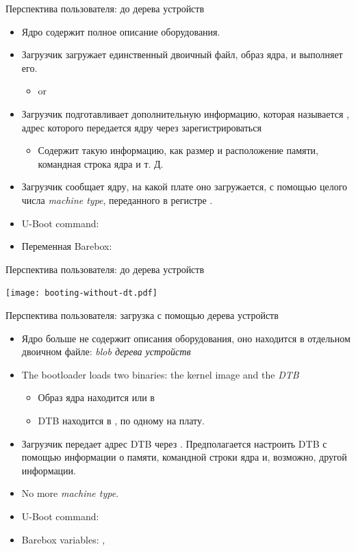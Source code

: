 \documentclass[obeyspaces,spaces,hyphens]{beamer}
\begin{document}
\begin{frame}{Перспектива пользователя: до дерева устройств}
  \begin{itemize}
  \item Ядро содержит полное описание оборудования.
  \item Загрузчик загружает единственный двоичный файл, образ ядра, и выполняет его.
    \begin{itemize}
    \item {} or 
    \end{itemize}
  \item Загрузчик подготавливает дополнительную информацию, которая называется
     , адрес которого передается ядру через
     зарегистрироваться 
    \begin{itemize}
    \item Содержит такую информацию, как размер и расположение памяти, командная строка ядра и т. Д.
    \end{itemize}
  \item Загрузчик сообщает ядру, на какой плате оно загружается, с помощью целого числа {\em machine type}, переданного в регистре
    .
  \item U-Boot command: 
  \item Переменная Barebox: 
  \end{itemize}
\end{frame}

\begin{frame}{Перспектива пользователя: до дерева устройств}
  \begin{center}
    \texttt{[image: booting-without-dt.pdf]}
  \end{center}
\end{frame}

\begin{frame}{Перспектива пользователя: загрузка с помощью дерева устройств}
  \begin{itemize}
  \item Ядро больше не содержит описания оборудования, оно находится в отдельном двоичном файле: {\em blob дерева устройств}
  \item The bootloader loads two binaries: the kernel image and the
    {\em DTB}
    \begin{itemize}
    \item Образ ядра находится  или в 
    \item DTB находится в , по одному на плату.
    \end{itemize}
  \item Загрузчик передает адрес DTB через . Предполагается настроить DTB с помощью информации о памяти, командной строки ядра и, возможно, другой информации.
  \item No more {\em machine type}.
  \item U-Boot command: 
  \item Barebox variables: , 
  \end{itemize}
\end{frame}
\end{document}
